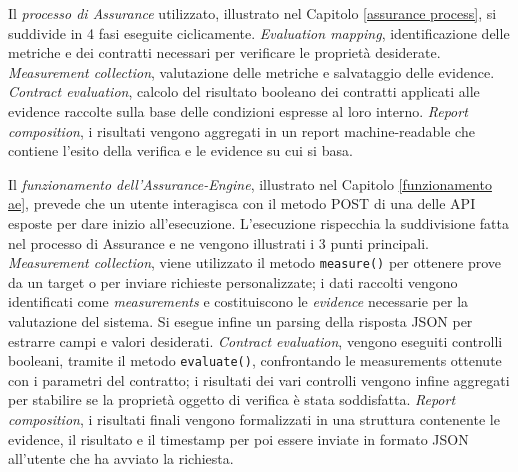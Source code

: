 Il \emph{processo di Assurance} utilizzato, illustrato nel Capitolo \ref{assurance process}, si suddivide in 4 fasi eseguite ciclicamente.
\textit{Evaluation mapping}, identificazione delle metriche e dei contratti necessari per verificare le proprietà desiderate. \textit{Measurement collection}, valutazione delle metriche e salvataggio delle evidence.
\textit{Contract evaluation}, calcolo del risultato booleano dei contratti applicati alle evidence raccolte sulla base delle condizioni espresse al loro interno. \textit{Report composition}, i risultati vengono aggregati in un report machine-readable che contiene l'esito della verifica e le evidence su cui si basa. 

Il \emph{funzionamento dell'Assurance-Engine}, illustrato nel Capitolo \ref{funzionamento ae}, prevede che un utente interagisca con il metodo POST di una delle \gls{API} esposte per dare inizio all'esecuzione.
L'esecuzione rispecchia la suddivisione fatta nel processo di Assurance e ne vengono illustrati i 3 punti principali.
\textit{Measurement collection}, viene utilizzato il metodo \texttt{measure()} per ottenere prove da un target o per inviare richieste personalizzate; i dati raccolti vengono identificati come \textit{measurements} e costituiscono le \textit{evidence} necessarie per la valutazione del sistema. Si esegue infine un parsing della risposta JSON per estrarre campi e valori desiderati.
\textit{Contract evaluation}, vengono eseguiti controlli booleani, tramite il metodo \texttt{evaluate()}, confrontando le measurements ottenute con i parametri del contratto; i risultati dei vari controlli vengono infine aggregati per stabilire se la proprietà oggetto di verifica è stata soddisfatta.
\textit{Report composition}, i risultati finali vengono formalizzati in una struttura contenente le evidence, il risultato e il timestamp per poi essere inviate in formato JSON all'utente che ha avviato la richiesta.

